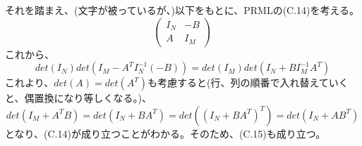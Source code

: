﻿\documentclass{jsarticle}
\begin{document}
それを踏まえ、(文字が被っているが、)以下をもとに、PRMLの(C.14)を考える。
\begin{equation}
\begin{pmatrix}
I_N & -B\\
A & I_M
\end{pmatrix}
\end{equation}
これから、
\begin{equation}
det(I_N)det(I_M-A^T I_N^{-1}(-B)) = det(I_M)det(I_N + B I_M^{-1} A^T)
\end{equation}
これより、$det(A) = det(A^T)$も考慮すると(行、列の順番で入れ替えていくと、偶置換になり等しくなる。)、
\begin{equation}
det(I_M + A^T B) = det(I_N + B A^T) = det((I_N + B A^T)^T) = det(I_N + A B^T)
\end{equation}
となり、(C.14)が成り立つことがわかる。そのため、(C.15)も成り立つ。
\end{document}
